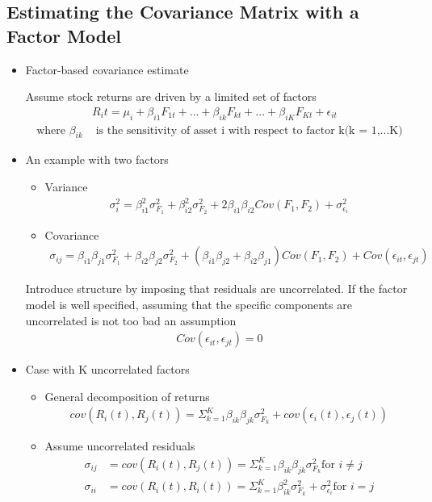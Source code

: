 \documentclass{maths}
\begin{document}
\subsection{Estimating the Covariance Matrix with a Factor Model}

\begin{itemize}

\item Factor-based covariance estimate

Assume stock returns are driven by a limited set of factors
\begin{align*}
&R_it = \mu_i + \beta_{i1}F_{1t}+...+\beta_{ik}F_{kt}+...+\beta_{iK}F_{Kt}+\epsilon_{it}\\
\text{where }\beta_{ik} &\text{ is the sensitivity of asset i with respect to factor k(k = 1,...K)}
\end{align*}

\item An example with two factors
\begin{itemize}
\item Variance
\begin{align*}
\sigma_i^2 = \beta_{i1}^2\sigma_{F_1}^2+\beta_{i2}^2\sigma_{F_2}^2+2\beta_{i1}\beta_{i2}Cov(F_1,F_2)+\sigma_{\epsilon_i}^2
\end{align*}

\item Covariance
\begin{align*}
\sigma_{ij} = \beta_{i1}\beta_{j1}\sigma_{F_1}^2+\beta_{i2}\beta_{j2}\sigma_{F_2}^2+(\beta_{i1}\beta_{j2}+\beta_{i2}\beta_{j1})Cov(F_1,F_2)+Cov(\epsilon_{it},\epsilon_{jt})
\end{align*}
 
\end{itemize}

Introduce structure by imposing that residuals are uncorrelated. If the factor model is well specified, assuming that
the specific components are
uncorrelated is not too bad an assumption
\begin{align*}
Cov(\epsilon_{it},\epsilon_{jt}) = 0
\end{align*}
 
 
\item Case with K uncorrelated factors
\begin{itemize}
\item General decomposition of returns
\begin{align*}
cov\left(R_i(t),R_j(t)\right) = \Sigma_{k=1}^K \beta_{ik}\beta_{jk}\sigma_{F_k}^2 + cov\left(\epsilon_i(t),\epsilon_j(t)\right)
\end{align*}
\item Assume uncorrelated residuals
\begin{align*}
\sigma_{ij} &= cov\left(R_i(t),R_j(t)\right) = \Sigma_{k=1}^K \beta_{ik}\beta_{jk}\sigma_{F_k}^2 \text{for } i \neq j\\
\sigma_{ii} &= cov\left(R_i(t),R_i(t)\right) = \Sigma_{k=1}^K \beta_{ik}^2\sigma_{F_k}^2 + \sigma_{\epsilon_i}^2 \text{for } i = j\\
\end{align*}
\end{itemize} 



\end{itemize}
\end{document}
